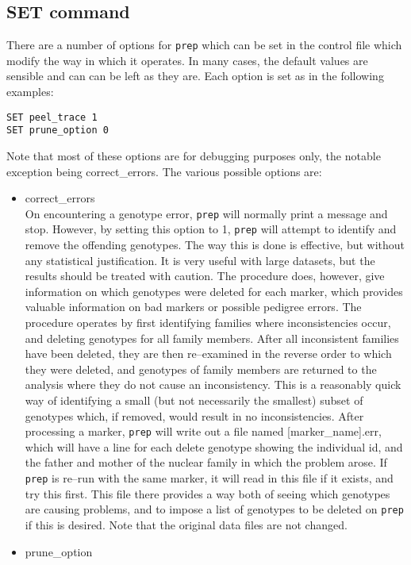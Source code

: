 \documentclass[10pt,a4paper]{article}
\newcommand{\Prep}{\texttt{prep}\xspace}
\begin{document}
\subsection{SET command}
\label{set_command}
There are a number of options for \Prep which can be set in the control file
which modify the way in which it operates.  In many cases, the default
values are sensible and can can be left as they are. Each option is set as
in the following examples:
\begin{verbatim}
SET peel_trace 1
SET prune_option 0
\end{verbatim}
Note that most of these options are for debugging purposes only, the notable
exception being correct\_errors. The various possible
options are:
\begin{itemize}
  \item correct\_errors\\
	 On encountering a genotype error, \Prep will normally print a message
	 and stop.  However, by setting this option to 1, \Prep will attempt to
	 identify and remove the offending genotypes.  The way this is done is
	 effective, but without any statistical justification.  It is very useful
	 with large datasets, but the results should be treated with caution. The
	 procedure does, however, give information on which genotypes were
	 deleted for each marker, which provides valuable information on bad
	 markers or possible pedigree errors. The procedure operates by first
	 identifying families where inconsistencies occur, and deleting genotypes
	 for all family members.  After all inconsistent families have been
	 deleted, they are then re--examined in the reverse order to which they
	 were deleted, and genotypes of family members are returned to the
	 analysis where they do not cause an inconsistency.  This is a reasonably
	 quick way of identifying a small (but not necessarily the smallest)
	 subset of genotypes which, if removed, would result in no
	 inconsistencies. After processing a marker, \Prep will write out a file
	 named [marker\_name].err, which will have a line for each delete
	 genotype showing the individual id, and the father and mother of the
	 nuclear family in which the problem arose.  If \Prep is re--run with the
	 same marker, it will read in this file if it exists, and try this first.
	 This file there provides a way both of seeing which genotypes are
	 causing problems, and to impose a list of genotypes to be deleted on
	 \Prep if this is desired.  Note that the original data files are not
	 changed.
  \item prune\_option\\

\end{itemize}
\end{document}
